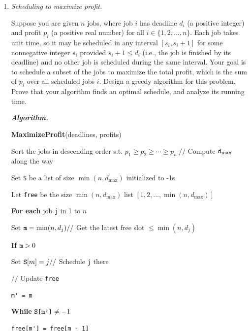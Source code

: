 \documentclass[11pt]{article}
\newcounter{totalpoints}
\newcommand{\points}[1]{\addtocounter{totalpoints}{#1}{[#1 point\ifthenelse{\equal{#1}{1}}{}{s}]}}
\begin{document}
\begin{enumerate}[leftmargin=*,start=0]
\item \emph{Scheduling to maximize profit.} \points{20}

Suppose you are given $n$ jobs, where job $i$ has deadline $d_i$ (a positive integer) and profit $p_i$ (a positive real number) for all $i \in \{1,2,\ldots,n\}$.  Each job takes unit time, so it may be scheduled in any interval $[s_i,s_i+1]$ for some nonnegative integer $s_i$ provided $s_i+1 \le d_i$ (i.e., the job is finished by its deadline) and no other job is scheduled during the same interval.  Your goal is to schedule a subset of the jobs to maximize the total profit, which is the sum of $p_i$ over all scheduled jobs $i$.  Design a greedy algorithm for this problem.  Prove that your algorithm finds an optimal schedule, and analyze its running time.

\hfill

\textbf{\textit{Algorithm.}}

\textbf{MaximizeProfit}(deadlines, profits)

\hspace{5mm} Sort the jobs in descending order s.t. $p_1 \geq p_2 \geq \cdots \geq p_n \ // $ Compute $\verb|d|_{\max}$ along the way

\hspace{5mm} Set \verb|S| be a list of size $\min(n, d_{\max})$ initialized to -1s

\hspace{5mm} Let \verb|free| be the size $\min(n, d_{\max})$ list $[1, 2, \ldots, \min(n, d_{\max})]$

\hspace{5mm} \textbf{For each} job \verb|j| in 1 to $n$

\hspace{10mm} Set $\verb|m| = \min(n, d_j) // $ Get the latest free slot $\leq \min(n, d_j)$

\hspace{10mm} \textbf{If} $\verb|m| > 0$

\hspace{15mm} Set $\verb|S|[m] = j // $ Schedule \verb|j| there

\hspace{15mm} $// $ Update \verb|free|

\hspace{15mm} \verb|m' = m|

\hspace{15mm} \textbf{While} $\verb|S[m']| \neq -1$

\hspace{20mm} \verb|free[m'] = free[m - 1]|


\end{enumerate}
\end{document}
